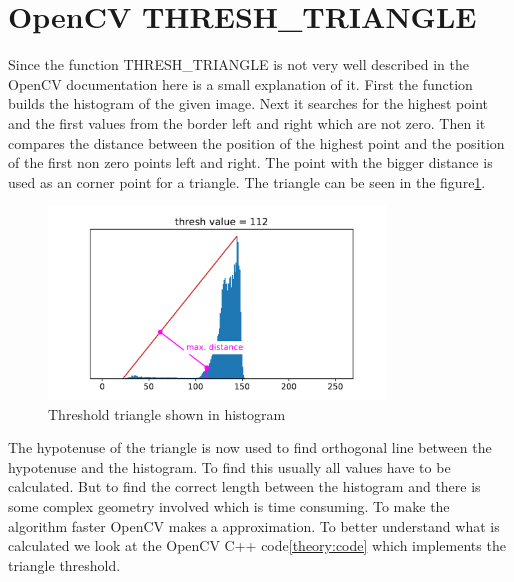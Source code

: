 \newpage
\section{OpenCV THRESH\_TRIANGLE }
Since the function THRESH\_TRIANGLE is not very well described in the OpenCV documentation here is a small explanation of it. First the function builds the histogram of the given image. Next it searches for the highest point and the first values from the border left and right which are not zero. Then it compares the distance between the position of the highest point and the position of the first non zero points left and right. The point with the bigger distance is used as an corner point for a triangle. The triangle can be seen in the figure\ref{theory:triangle}.

\begin{figure}[ht]
	\centering
	\includegraphics[width=0.8\textwidth]{2-theory/threshold/triangle.pdf}
	\caption{Threshold triangle shown in histogram\label{theory:triangle}}
\end{figure} 
The hypotenuse of the triangle is now used to find orthogonal line between the hypotenuse and the histogram. To find this usually all values have to be calculated. But to find the correct length between the histogram and there is some complex geometry involved which is time consuming. To make the algorithm faster OpenCV makes a approximation. To better understand what is calculated we look at the OpenCV C++ code\ref{theory:code} which implements the triangle threshold. 


\lstset{style=mystyle}


